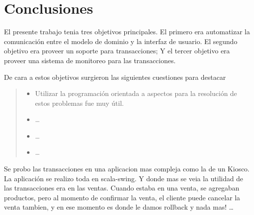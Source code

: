 \section{Conclusiones}
\label{sec:conclusions}

El presente trabajo tenia tres objetivos principales. El primero era automatizar
la comunicación entre el modelo de dominio y la interfaz de usuario. El segundo
objetivo era proveer un soporte para transacciones; Y el tercer objetivo era
proveer una sistema de monitoreo para las transacciones.

De cara a estos objetivos surgieron las siguientes cuestiones para destacar

\begin{quote}

	\begin{itemize}
	  
		\item Utilizar la programación orientada a aspectos para la resolución de
		estos problemas fue muy útil.
		
		\item  \ldots
		
		\item \ldots
		\item \ldots
	  
	\end{itemize}
	
\end{quote}

Se probo las transacciones en una aplicacion mas compleja como la de un Kiosco.
La aplicación se realizo toda en scala-swing. Y donde mas se veia la utilidad de
las transacciones era en las ventas. Cuando estaba en una venta, se agregaban
productos, pero al momento de confirmar la venta, el cliente puede cancelar la
venta tambien, y en ese momento es donde le damos rollback y nada mas! \ldots
{}
